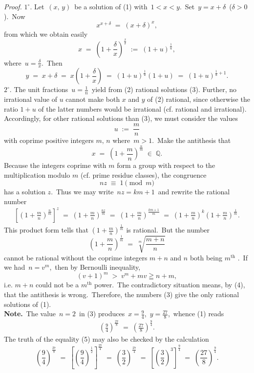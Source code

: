 \documentclass[12pt]{article}
\theoremstyle{definition}
\begin{document}
\emph{Proof.} $1^\circ$. Let\, $(x,\,y)$\, be a solution of (1) with\, $1 < x < y$.\, Set\, $y = x\!+\!\delta$\, 
($\delta > 0$).\, Now
$$x^{x+\delta} \;=\; (x\!+\!\delta)^x,$$
from which we obtain easily
$$x \;=\; \left(1\!+\!\frac{\delta}{x}\right)^{\frac{x}{\delta}} \;:=\; (1\!+\!u)^{\frac{1}{u}},$$
where\, $u = \frac{\delta}{x}$.\, Then 
$$y \;=\; x\!+\!\delta \;=\; x\!\left(1\!+\!\frac{\delta}{x}\right) 
\;=\; (1\!+\!u)^{\frac{1}{u}}(1\!+\!u) \;=\; (1\!+\!u)^{\frac{1}{u}+1}.$$
$2^\circ$. The unit fractions\, $u = \frac{1}{n}$\, yield from (2) rational solutions (3).
Further, no irrational value of $u$ cannot make both $x$ and $y$ of (2) rational, since otherwise the ratio $1\!+\!u$ of the latter numbers would be irrational (cf. rational and irrational).\, Accordingly, for other rational solutions than (3), we must consider the values
$$u \;:=\; \frac{m}{n}$$
with coprime positive integers $m,\,n$ where\, $m > 1$.\, Make the antithesis that
$$x \;=\; \left(1\!+\!\frac{m}{n}\right)^{\frac{n}{m}} \;\in\; \mathbb{Q}.$$
Because the integers coprime with $m$ form a group with respect to the multiplication modulo $m$ (cf. prime residue classes), the congruence
$$nz \;\equiv\; 1 \pmod{m}$$
has a solution $z$.\, Thus we may write\, $nz = km\!+\!1$\, and rewrite the rational number
\begin{align}
\left[\left(1\!+\!\frac{m}{n}\right)^{\frac{n}{m}}\right]^z \;=\; \left(1\!+\!\frac{m}{n}\right)^{\frac{nz}{m}} 
\;=\; \left(1\!+\!\frac{m}{n}\right)^{\frac{km+1}{m}} 
\;=\; \left(1\!+\!\frac{m}{n}\right)^k\left(1\!+\!\frac{m}{n}\right)^{\frac{1}{m}}.
\end{align}
This product form tells that $\left(1\!+\!\frac{m}{n}\right)^{\frac{1}{m}}$ is rational.\, But the number
$$\left(1\!+\!\frac{m}{n}\right)^{\frac{1}{m}} \;=\; \sqrt[m]{\frac{m\!+\!n}{n}}$$ 
cannot be rational without the coprime integers $m\!+\!n$ and $n$ both being $m^{\mbox{th}}$ .\, If we had\, $n = v^m$,\, then by Bernoulli inequality,
$$(v\!+\!1)^m \;>\; v^m\!+\!mv \geqq n\!+\!m,$$
i.e. $m\!+\!n$ could not be a $m^{\mbox{th}}$ power.\, The contradictory situation means, by (4), that the antithesis is wrong.\, Therefore, the numbers (3) give the only rational solutions of (1).\\


\textbf{Note.}\, The value\, $n = 2$\, in (3) produces\, $x = \frac{9}{4}$,\, $y = \frac{27}{8}$,\, whence (1) reads
\begin{align}
\left(\frac{9}{4}\right)^{\frac{27}{8}} \;=\; \left(\frac{27}{8}\right)^{\frac{9}{4}}\!.
\end{align}
The truth of the equality (5) may also be checked by the calculation
$$\left(\frac{9}{4}\right)^{\frac{27}{8}} \;=\; \left[\left(\frac{9}{4}\right)^{\frac{1}{2}}\right]^{\frac{27}{4}} 
\;=\; \left(\frac{3}{2}\right)^{\frac{27}{4}} \;=\; \left[\left(\frac{3}{2}\right)^3\right]^{\frac{9}{4}} 
\;=\; \left(\frac{27}{8}\right)^{\frac{9}{4}}\!.$$
\end{document}
